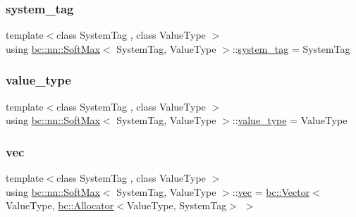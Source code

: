 \mbox{\label{structbc_1_1nn_1_1SoftMax_a7a97d15ba35c8cb9de0322b8b446bc46}} 
\subsubsection{\texorpdfstring{system\+\_\+tag}{system\_tag}}
{\footnotesize\ttfamily template$<$class System\+Tag , class Value\+Type $>$ \\
using \hyperlink{structbc_1_1nn_1_1SoftMax}{bc\+::nn\+::\+Soft\+Max}$<$ System\+Tag, Value\+Type $>$\+::\hyperlink{structbc_1_1nn_1_1SoftMax_a7a97d15ba35c8cb9de0322b8b446bc46}{system\+\_\+tag} =  System\+Tag}

\mbox{\label{structbc_1_1nn_1_1SoftMax_a7e53ef1c3b39ca65afa99d237b9353fa}} 
\subsubsection{\texorpdfstring{value\+\_\+type}{value\_type}}
{\footnotesize\ttfamily template$<$class System\+Tag , class Value\+Type $>$ \\
using \hyperlink{structbc_1_1nn_1_1SoftMax}{bc\+::nn\+::\+Soft\+Max}$<$ System\+Tag, Value\+Type $>$\+::\hyperlink{structbc_1_1nn_1_1SoftMax_a7e53ef1c3b39ca65afa99d237b9353fa}{value\+\_\+type} =  Value\+Type}

\mbox{\label{structbc_1_1nn_1_1SoftMax_acb0aee6fde514718c2f26eb711a0b710}} 
\subsubsection{\texorpdfstring{vec}{vec}}
{\footnotesize\ttfamily template$<$class System\+Tag , class Value\+Type $>$ \\
using \hyperlink{structbc_1_1nn_1_1SoftMax}{bc\+::nn\+::\+Soft\+Max}$<$ System\+Tag, Value\+Type $>$\+::\hyperlink{structbc_1_1nn_1_1SoftMax_acb0aee6fde514718c2f26eb711a0b710}{vec} =  \hyperlink{namespacebc_a14d40e8e95957f92a57853921837a15d}{bc\+::\+Vector}$<$Value\+Type, \hyperlink{classbc_1_1allocators_1_1Allocator}{bc\+::\+Allocator}$<$Value\+Type, System\+Tag$>$ $>$}



